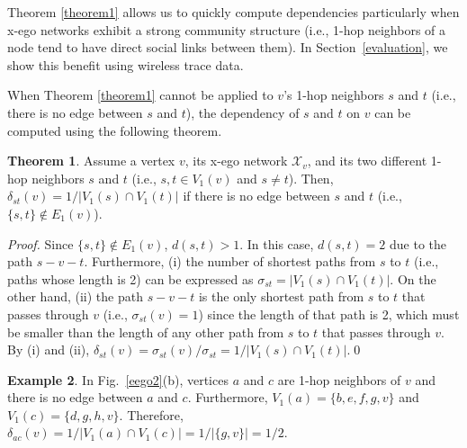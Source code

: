 \documentclass[preprint,12pt,authoryear]{elsarticle}
\newcommand{\D}[3]{\delta_{{#1}{#2}}({#3})}
\newcommand{\V}[2]{V_{#2}({#1})}
\newcommand{\LV}[2]{V_{\le #2}({#1})}
\newcommand{\E}[2]{E_{#2}({#1})}
\newcommand{\XN}[1]{\mathcal{X}_{{#1}}}
\theoremstyle{definition}
\newtheorem{theorem}{Theorem}[section]
\newtheorem{example}[theorem]{Example}
\begin{document}
Theorem \ref{theorem1} allows us to quickly compute dependencies particularly when x-ego networks exhibit a strong community structure (i.e., 1-hop neighbors of a node tend to have direct social links between them).
In Section~\ref{evaluation}, we show this benefit using wireless trace data.

When Theorem \ref{theorem1} cannot be applied to $v$'s 1-hop neighbors $s$ and $t$ (i.e., there is no edge between $s$ and $t$), the dependency of $s$ and $t$ on $v$ can be computed using the following theorem.

\begin{theorem}
\label{theorem2} 
Assume a vertex $v$, its x-ego network $\XN{v}$, and its two different 1-hop neighbors $s$ and $t$ (i.e., $s, t \in \V{v}{1}$ and $s \ne t$).
Then, $\D{s}{t}{v} = {1}/{|\V{s}{1} \cap \V{t}{1}|}$ if there is no edge between $s$ and $t$ (i.e., $\{s, t\} \notin \E{v}{1}$).
\begin{proof}
Since $\{s, t\} \notin \E{v}{1}$, $d(s, t) > 1$.
In this case, $d(s, t) = 2$ due to the path $s - v - t$.
Furthermore, (i) the number of shortest paths from $s$ to $t$ (i.e., paths whose length is 2) can be expressed as $\sigma_{st} = |\V{s}{1} \cap \V{t}{1}|$.
On the other hand, (ii) the path $s-v-t$ is the only shortest path from $s$ to $t$ that passes through $v$ (i.e., $\sigma_{st}(v) = 1$) since the length of that path is 2, which must be smaller than the length of any other path from $s$ to $t$ that passes through $v$.
By (i) and (ii), $\D{s}{t}{v} = \sigma_{st}(v)/\sigma_{st} = {1}/{|\V{s}{1} \cap \V{t}{1}|}$.\hfill\qed
\end{proof}
\end{theorem}


\begin{example}
\label{example2} 
In Fig.~\ref{eego2}(b), vertices $a$ and $c$ are 1-hop neighbors of $v$ and there is no edge between $a$ and $c$.
Furthermore, $\V{a}{1} = \lbrace b, e, f, g, v\rbrace$ and $\V{c}{1} = \lbrace d, g, h, v\rbrace$.
Therefore, $\D{a}{c}{v}=1/|\V{a}{1} \cap \V{c}{1}|=1/|\{g, v \}|=1/2$.

\end{example}
\end{document}
